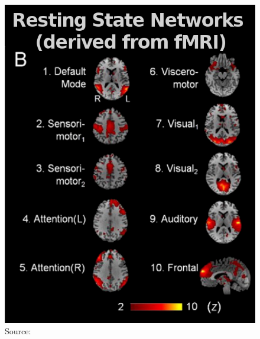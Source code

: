 \documentclass[9pt,presentation]{beamer}   %
\begin{document}
\begin{frame}[t]
\begin{columns}
\begin{column}{0.48\textwidth}
\begin{figure}[H]
\begin{center}
\includegraphics[scale=0.2]{RSNs}
\caption{Source: \cite{Yuan20122062}}
\end{center}
\end{figure}

    \end{column}
\end{columns}


\end{frame}
\end{document}
